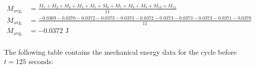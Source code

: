 \documentclass{article}
\begin{document}
            \begin{equation}
                \begin{aligned}
                    M_{\text{avg, 100}} &= \frac{M_1 + M_2 + M_3 + M_4 + M_5 + M_6 + M_7 + M_8 + M_9 + M_{10} + M_{11}}{11} \\
                    M_{\text{avg, 100}} &= \frac{-0.0369 -0.0370 -0.0372 -0.0373 -0.0373 -0.0372 -0.0373 -0.0373 -0.0373 -0.0371 -0.0370}{11} \\
                    M_{\text{avg, 100}} &= -0.0372 \text{ J} \\
                \end{aligned}\label{eq:average-mechanical-energy-cycle-at-100-seconds}
            \end{equation}
            
            The following table contains the mechanical energy data for the cycle before $t=125$ seconds:
            
\end{document}
